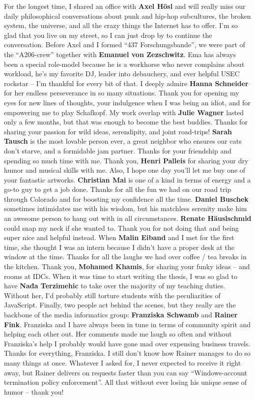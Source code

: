 For the longest time, I shared an office with \textbf{Axel Hösl} and will really miss our daily philosophical conversations about punk and hip-hop subcultures, the broken system, the universe, and all the crazy things the Internet has to offer. I’m so glad that you live on my street, so I can just drop by to continue the conversation. Before Axel and I formed “437 Forschungsbande”, we were part of the “A206-crew” together with \textbf{Emanuel von Zezschwitz}. Ema has always been a special role-model because he is a workhorse who never complains about workload, he’s my favorite DJ, leader into debauchery, and ever helpful USEC rockstar -- I'm thankful for every bit of that. I deeply admire \textbf{Hanna Schneider} for her endless perseverance in so many situations. Thank you for opening my eyes for new lines of thoughts, your indulgence when I was being an idiot, and for empowering me to play Schafkopf. My work overlap with \textbf{Julie Wagner} lasted only a few months, but that was enough to become the best buddies. Thanks for sharing your passion for wild ideas, serendipity, and joint road-trips! \textbf{Sarah Tausch} is the most lovable person ever, a great neighbor who ensures our cats don’t starve, and a formidable jam partner. Thanks for your friendship and spending so much time with me. Thank you, \textbf{Henri Palleis} for sharing your dry humor and musical skills with me. Also, I hope one day you’ll let me buy one of your fantastic artworks. \textbf{Christian Mai} is one of a kind in terms of energy and a go-to guy to get a job done. Thanks for all the fun we had on our road trip through Colorado and for boosting my confidence all the time. \textbf{Daniel Buschek} sometimes intimidates me with his wisdom, but his matchless serenity make him an awesome person to hang out with in all circumstances. \textbf{Renate Häuslschmid} could snap my neck if she wanted to. Thank you for not doing that and being super nice and helpful instead. When \textbf{Malin Eiband} and I met for the first time, she thought I was an intern because I didn’t have a proper desk at the window at the time. Thanks for all the laughs we had over coffee / tea breaks in the kitchen. Thank you, \textbf{Mohamed Khamis}, for sharing your funky ideas -- and rooms at IDCs. When it was time to start writing the thesis, I was so glad to have \textbf{Nađa Terzimehic} to take over the majority of my teaching duties. Without her, I’d probably still torture students with the peculiarities of JavaScript. Finally, two people act behind the scenes, but they really are the backbone of the media informatics group: \textbf{Franziska Schwamb} and \textbf{Rainer Fink}. Franziska and I have always been in tune in terms of community spirit and helping each other out. Her comments made me laugh so often and without Franziska’s help I probably would have gone mad over expensing business travels. Thanks for everything, Franziska. I still don’t know how Rainer manages to do so many things at once. Whatever I asked for, I never expected to receive it right away, but Rainer delivers on requests faster than you can say “Windows-account termination policy enforcement”. All that without ever losing his unique sense of humor -- thank you!

